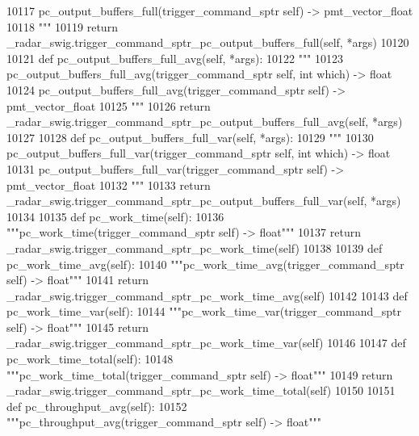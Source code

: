 \begin{DoxyCode}
{{{{{{{{{{{{{{{{{{{{{{{{{{{{{{{{10117 \textcolor{stringliteral}{        pc\_output\_buffers\_full(trigger\_command\_sptr self) -> pmt\_vector\_float}
10118 \textcolor{stringliteral}{        """}
10119         \textcolor{keywordflow}{return} \_radar\_swig.trigger\_command\_sptr\_pc\_output\_buffers\_full(self, *args)
10120 
10121     \textcolor{keyword}{def }pc_output_buffers_full_avg(self, *args):
10122         \textcolor{stringliteral}{"""}
10123 \textcolor{stringliteral}{        pc\_output\_buffers\_full\_avg(trigger\_command\_sptr self, int which) -> float}
10124 \textcolor{stringliteral}{        pc\_output\_buffers\_full\_avg(trigger\_command\_sptr self) -> pmt\_vector\_float}
10125 \textcolor{stringliteral}{        """}
10126         \textcolor{keywordflow}{return} \_radar\_swig.trigger\_command\_sptr\_pc\_output\_buffers\_full\_avg(self, *args)
10127 
10128     \textcolor{keyword}{def }pc_output_buffers_full_var(self, *args):
10129         \textcolor{stringliteral}{"""}
10130 \textcolor{stringliteral}{        pc\_output\_buffers\_full\_var(trigger\_command\_sptr self, int which) -> float}
10131 \textcolor{stringliteral}{        pc\_output\_buffers\_full\_var(trigger\_command\_sptr self) -> pmt\_vector\_float}
10132 \textcolor{stringliteral}{        """}
10133         \textcolor{keywordflow}{return} \_radar\_swig.trigger\_command\_sptr\_pc\_output\_buffers\_full\_var(self, *args)
10134 
10135     \textcolor{keyword}{def }pc_work_time(self):
10136         \textcolor{stringliteral}{"""pc\_work\_time(trigger\_command\_sptr self) -> float"""}
10137         \textcolor{keywordflow}{return} \_radar\_swig.trigger\_command\_sptr\_pc\_work\_time(self)
10138 
10139     \textcolor{keyword}{def }pc_work_time_avg(self):
10140         \textcolor{stringliteral}{"""pc\_work\_time\_avg(trigger\_command\_sptr self) -> float"""}
10141         \textcolor{keywordflow}{return} \_radar\_swig.trigger\_command\_sptr\_pc\_work\_time\_avg(self)
10142 
10143     \textcolor{keyword}{def }pc_work_time_var(self):
10144         \textcolor{stringliteral}{"""pc\_work\_time\_var(trigger\_command\_sptr self) -> float"""}
10145         \textcolor{keywordflow}{return} \_radar\_swig.trigger\_command\_sptr\_pc\_work\_time\_var(self)
10146 
10147     \textcolor{keyword}{def }pc_work_time_total(self):
10148         \textcolor{stringliteral}{"""pc\_work\_time\_total(trigger\_command\_sptr self) -> float"""}
10149         \textcolor{keywordflow}{return} \_radar\_swig.trigger\_command\_sptr\_pc\_work\_time\_total(self)
10150 
10151     \textcolor{keyword}{def }pc_throughput_avg(self):
10152         \textcolor{stringliteral}{"""pc\_throughput\_avg(trigger\_command\_sptr self) -> float"""}
}}}}}}}}}}}}}}}}}}}}}}}}}}}}}}}}
\end{DoxyCode}

